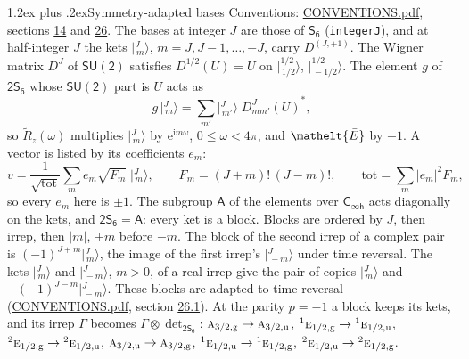 \documentclass[10pt,a4paper]{article}
\makeatletter
\renewcommand\section{\@startsection{section}{1}{\z@}{-3ex plus -1ex minus -.2ex}%
  {1.2ex plus .2ex}{\normalfont\large\sffamily\bfseries\color{parttitle}}}
\numberwithin{equation}{section}
\newcommand{\eltfont}[1]{{\let\sigma\eltsigma\mathelt{#1}}}
\newcommand{\grp}[1]{\mathsf{#1}}
\newcommand{\irr}[1]{\text{\normalfont\scshape #1}}
\newcommand{\conjpair}[1]{{}^{#1}}
\newcommand{\elt}[1]{\eltfont{#1}}
\newcommand{\ptag}[1]{\mathrm{#1}}
\newcommand{\iunit}{\mathrm{i}}
\newcommand{\expe}{\mathrm{e}}
\newcommand{\irrJp}[2]{D^{(#1,#2)}}
\newcommand{\wignerD}[1]{D^{#1}}
\newcommand{\conj}[1]{{#1}^{*}}
\newcommand{\irrprod}{\otimes}
\newcommand{\jm}[2]{\bigl\lvert{}^{#1}_{\,#2}\bigr\rangle}
\newcommand{\barred}[1]{\bar{#1}}
\newcommand{\lift}[1]{\tilde{#1}}
\makeatother
\begin{document}
\section{Symmetry-adapted bases}\label{s:bases}
Conventions: \href{../../CONVENTIONS.pdf}{CONVENTIONS.pdf}, sections \href{../../../rotation/CONVENTIONS.pdf\#conv.14}{14} and \href{../../CONVENTIONS.pdf\#conv.26}{26}.
\leavevmode\label{n:index.m}\label{n:vector.ket}The bases at integer $J$ are those of \href{../../../rotation/data/pdf/S6.pdf}{$\grp{S_{6}}$} (\texttt{integerJ}), and at half-integer $J$ the kets $\jm{J}{m}$, $m = J, J-1, \dots, -J$, carry $\irrJp{J}{+1}$. \label{n:matrix.wigner}The Wigner matrix $\wignerD{J}$ of $\grp{SU(2)}$ satisfies $\wignerD{1/2}(U) = U$ on $\jm{1/2}{1/2}$, $\jm{1/2}{-1/2}$. The element $g$ of $\grp{2S_{6}}$ whose $\grp{SU(2)}$ part is $U$ acts as
\begin{equation}\label{e:action}g\,\jm{J}{m} = \sum_{m'} \jm{J}{m'}\; \conj{\wignerD{J}_{m m'}(U)},\end{equation}
so $\lift{R}_{z}(\omega)$ multiplies $\jm{J}{m}$ by $\expe^{\iunit m\omega}$, $0 \le \omega < 4\pi$, and $\elt{\barred{E}}$ by $-1$. \label{n:index.ketcoefficient}\label{n:vector.basis.symmetry}\label{n:index.ketweight}\label{n:index.total}A vector is listed by its coefficients $e_m$:
\begin{equation}\label{e:ket}v = \frac{1}{\sqrt{\mathrm{tot}}}\sum_m e_m\sqrt{F_m}\;\jm{J}{m},\qquad F_m = (J+m)!\,(J-m)!,\qquad \mathrm{tot} = \sum_m |e_m|^2F_m,\end{equation}
so every $e_m$ here is $\pm 1$.
\leavevmode\label{n:group.A}The subgroup $\grp{A}$ of the elements over $\grp{C_{\infty h}}$ acts diagonally on the kets, and $\grp{2S_{6}} = \grp{A}$: every ket is a block. Blocks are ordered by $J$, then irrep, then $|m|$, $+m$ before $-m$. The block of the second irrep of a complex pair is $(-1)^{J+m}\jm{J}{m}$, the image of the first irrep's $\jm{J}{-m}$ under time reversal. The kets $\jm{J}{m}$ and $\jm{J}{-m}$, $m > 0$, of a real irrep give the pair of copies $\jm{J}{m}$ and $-(-1)^{J-m}\jm{J}{-m}$. These blocks are adapted to time reversal (\href{../../CONVENTIONS.pdf}{CONVENTIONS.pdf}, section \href{../../CONVENTIONS.pdf\#conv.26.1}{26.1}).
At the parity $p = -1$ a block keeps its kets, and its irrep $\Gamma$ becomes $\Gamma \irrprod \det_{\grp{2S_{6}}}$: $\irr{a}_{3/2,\ptag{g}} \to \irr{a}_{3/2,\ptag{u}}$, $\conjpair{1}\irr{e}_{1/2,\ptag{g}} \to \conjpair{1}\irr{e}_{1/2,\ptag{u}}$, $\conjpair{2}\irr{e}_{1/2,\ptag{g}} \to \conjpair{2}\irr{e}_{1/2,\ptag{u}}$, $\irr{a}_{3/2,\ptag{u}} \to \irr{a}_{3/2,\ptag{g}}$, $\conjpair{1}\irr{e}_{1/2,\ptag{u}} \to \conjpair{1}\irr{e}_{1/2,\ptag{g}}$, $\conjpair{2}\irr{e}_{1/2,\ptag{u}} \to \conjpair{2}\irr{e}_{1/2,\ptag{g}}$.
\end{document}
